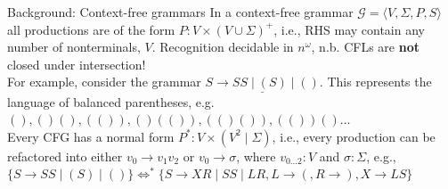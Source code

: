 \documentclass{beamer}
\begin{document}
    \begin{frame}{Background: Context-free grammars}
        In a context-free grammar $\mathcal{G} = \langle V, \Sigma, P, S\rangle$ all productions are of the form $P: V\times (V \cup \Sigma)^+$, i.e., RHS may contain any number of nonterminals, $V$. Recognition decidable in $n^\omega$, n.b. CFLs are \textbf{not} closed under intersection!\newline\\
        For example, consider the grammar $\underline{S \rightarrow S S \mid ( S ) \mid ()}$. This represents the language of balanced parentheses, e.g. $(), ()(), (()), ()(()), (()()), (())()\ldots$\newline\\
        Every CFG has a normal form $P^*: V \times (V^2 \mid \Sigma)$, i.e., every production can be refactored into either $v_0 \rightarrow v_1 v_2$ or $v_0 \rightarrow \sigma$, where $v_{0\ldots2}: V$ and $\sigma: \Sigma$, e.g., $\{S \rightarrow S S \mid ( S ) \mid ()\}\Leftrightarrow^*\{S\rightarrow XR \mid SS \mid LR, L \rightarrow (, R \rightarrow ), X\rightarrow LS\}$


\end{frame}
\end{document}
